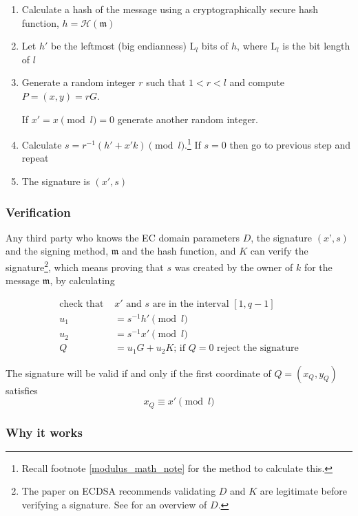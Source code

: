 \begin{enumerate}
	
	\item Calculate a hash of the message using a cryptographically secure hash function, \(h = \mathcal{H}(\mathfrak{m})\)
	
	\item Let $h'$ be the leftmost (big endianness) L$_l$ bits of $h$, where L$_l$ is the bit length of $l$
	
	\item Generate a random integer \(r\) such that \(1 < r < l\) and compute \(P = (x, y) = r G\). 

       If \(x' = x \pmod{l} = 0\) generate another random integer.
	
	\item Calculate \(s = r^{-1} (h' + x' k) \pmod l\).\footnote{Recall footnote \ref{modulus_math_note} for the method to calculate this.} If \(s = 0\) then go to previous step and repeat
	
	\item The signature is \((x', s)\)
\end{enumerate}


\subsubsection*{Verification}

Any third party who knows the EC domain parameters $D$, the signature $(x’, s)$ and the signing method, $\mathfrak{m}$ and the hash function, and $K$  can verify the signature\footnote{The paper on ECDSA \cite{ecdsa} recommends validating $D$ and $K$ are legitimate before verifying a signature. See \cite{eddsa-irtf} for an overview of $D$.}, which means proving that $s$ was created by the owner of $k$ for the message $\mathfrak{m}$, by calculating

\begin{align*}
  \textrm{check that } & x' \textrm{ and } s \textrm{ are in the interval } [1,q-1] \\
  u_1 & = s^{-1} h' \pmod{l} \\
  u_2 & = s^{-1} x' \pmod{l} \\
  Q   & = u_1 G + u_2 K \textrm{; if $Q = 0$ reject the signature}
\end{align*}

The signature will be valid if and only if the first coordinate of \(Q = (x_Q, y_Q)\) satisfies  
\[x_Q \equiv x' \pmod {l}\]

\subsubsection*{Why it works}

